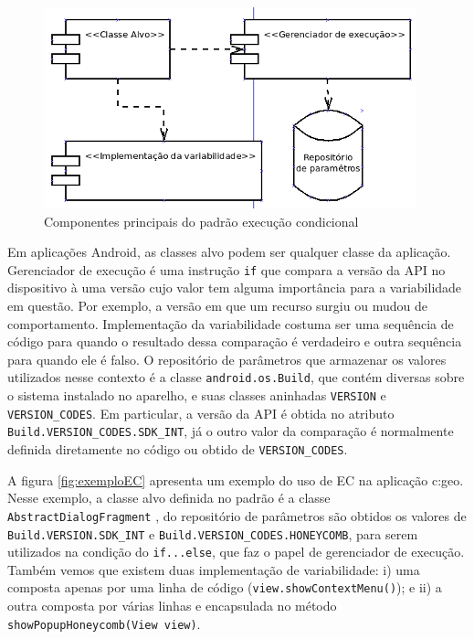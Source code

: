 \begin{figure}[ht]
\centering
\includegraphics{imagens/execucao_condicional.png}
\caption{Componentes principais do padrão execução condicional}
\label{fig:EC}
\end{figure}

Em aplicações Android, as classes alvo podem ser qualquer classe da aplicação.
Gerenciador de execução é uma instrução \texttt{if} que compara a versão da API
no dispositivo à uma versão cujo valor tem alguma importância para a variabilidade
em questão. Por exemplo, a versão em que um recurso surgiu ou mudou de comportamento.
Implementação da variabilidade costuma ser uma sequência de código para quando o
resultado dessa comparação é verdadeiro e outra sequência para quando ele é falso.
O repositório de parâmetros que armazenar os valores utilizados nesse contexto é a
classe \texttt{android.os.Build}, que contém diversas sobre o sistema instalado
no aparelho, e suas classes aninhadas \texttt{VERSION} e \texttt{VERSION\_CODES}.
Em particular, a versão da API é obtida no atributo \texttt{Build.VERSION\_CODES.SDK\_INT},
já o outro valor da comparação é normalmente definida diretamente no código ou obtido de
\texttt{VERSION\_CODES}.  

A figura \ref{fig:exemploEC} apresenta um exemplo do uso de EC na aplicação c:geo. 
Nesse exemplo, a classe alvo definida no padrão é a classe \texttt{AbstractDialogFragment}
, do repositório
de parâmetros são obtidos os valores de \texttt{Build.VERSION.SDK\_INT} e
\texttt{Build.VERSION\_CODES.HONEYCOMB}, para serem utilizados na condição do \texttt{if...else}, 
que faz o papel de gerenciador de execução. Também vemos que existem duas
implementação de variabilidade: i) uma composta apenas por uma linha de código
(\texttt{view.showContextMenu()}); e ii) a outra composta por várias linhas e
encapsulada no método \texttt{showPopupHoneycomb(View view)}.

